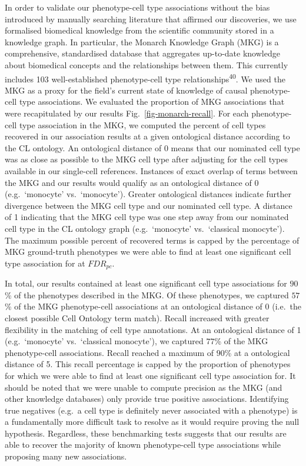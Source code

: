 \documentclass[
]{article}
\begin{document}
In order to validate our phenotype-cell type associations without the
bias introduced by manually searching literature that affirmed our
discoveries, we use formalised biomedical knowledge from the scientific
community stored in a knowledge graph. In particular, the Monarch
Knowledge Graph (MKG) is a comprehensive, standardised database that
aggregates up-to-date knowledge about biomedical concepts and the
relationships between them. This currently includes 103 well-established
phenotype-cell type relationships\textsuperscript{40}. We used the MKG
as a proxy for the field's current state of knowledge of causal
phenotype-cell type associations. We evaluated the proportion of MKG
associations that were recapitulated by our results
Fig.~\ref{fig-monarch-recall}. For each phenotype-cell type association
in the MKG, we computed the percent of cell types recovered in our
association results at a given ontological distance according to the CL
ontology. An ontological distance of 0 means that our nominated cell
type was as close as possible to the MKG cell type after adjusting for
the cell types available in our single-cell references. Instances of
exact overlap of terms between the MKG and our results would qualify as
an ontological distance of 0 (e.g.~`monocyte' vs.~`monocyte'). Greater
ontological distances indicate further divergence between the MKG cell
type and our nominated cell type. A distance of 1 indicating that the
MKG cell type was one step away from our nominated cell type in the CL
ontology graph (e.g.~`monocyte' vs.~`classical monocyte'). The maximum
possible percent of recovered terms is capped by the percentage of MKG
ground-truth phenotypes we were able to find at least one significant
cell type association for at \(FDR_{pc}\).

In total, our results contained at least one significant cell type
associations for \(90\)\% of the phenotypes described in the MKG. Of
these phenotypes, we captured \(57\)\% of the MKG phenotype-cell
associations at an ontological distance of 0 (i.e.~the closest possible
Cell Ontology term match). Recall increased with greater flexibility in
the matching of cell type annotations. At an ontological distance of 1
(e.g.~`monocyte' vs.~`classical monocyte'), we captured \(77\)\% of the
MKG phenotype-cell associations. Recall reached a maximum of \(90\)\% at
a ontological distance of 5. This recall percentage is capped by the
proportion of phenotypes for which we were able to find at least one
significant cell type association for. It should be noted that we were
unable to compute precision as the MKG (and other knowledge databases)
only provide true positive associations. Identifying true negatives
(e.g.~a cell type is definitely never associated with a phenotype) is a
fundamentally more difficult task to resolve as it would require proving
the null hypothesis. Regardless, these benchmarking tests suggests that
our results are able to recover the majority of known phenotype-cell
type associations while proposing many new associations.
\end{document}
